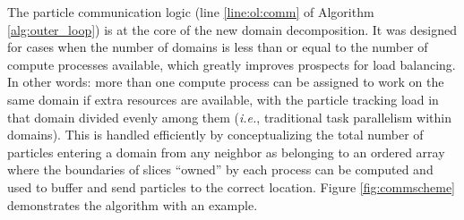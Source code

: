 \documentclass[12pt,twoside]{mitthesis-exec}
\begin{document}
The particle communication logic (line \ref{line:ol:comm} of Algorithm
\ref{alg:outer_loop}) is at the core of the new domain decomposition. It was
designed for cases when the number of domains is less than or equal to the
number of compute processes available, which greatly improves prospects for load
balancing. In other words: more than one compute process can be assigned to work
on the same domain if extra resources are available, with the particle tracking
load in that domain divided evenly among them (\emph{i.e.}, traditional task
parallelism within domains). This is handled efficiently by conceptualizing the total number of
particles entering a domain from any neighbor as belonging to an ordered array
where the boundaries of slices ``owned'' by each process can
be computed and used to buffer and send particles to the correct location.
Figure \ref{fig:commscheme} demonstrates the algorithm with an example.
\end{document}
